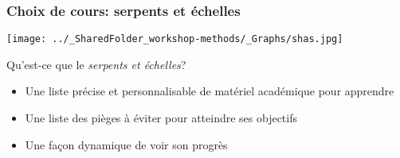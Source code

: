 \documentclass{beamer}
\begin{document}

   \begin{frame}
    
      \frametitle{Choix de cours: serpents et échelles} \vspace{1cm}
      
      
        \begin{center}
        
          \texttt{[image: ../\_SharedFolder\_workshop-methods/\_Graphs/shas.jpg]}
         
        \end{center} 
      
    Qu'est-ce que le \textit{serpents et échelles}?

        \begin{itemize}
          \item{Une liste précise et personnalisable de matériel académique pour apprendre \R}
          \item{Une liste des pièges à éviter pour atteindre ses objectifs}
          \item{Une façon dynamique de voir son progrès}
        \end{itemize}

    \end{frame}

\end{document}
